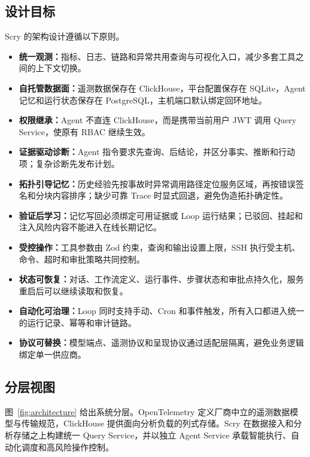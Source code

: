 \documentclass[conference,10pt]{IEEEtran}
\begin{document}
\subsection{设计目标}

Scry 的架构设计遵循以下原则。

\begin{itemize}
  \item \textbf{统一观测：}指标、日志、链路和异常共用查询与可视化入口，减少多套工具之间的上下文切换。
  \item \textbf{自托管数据面：}遥测数据保存在 ClickHouse，平台配置保存在 SQLite，Agent 记忆和运行状态保存在 PostgreSQL，主机端口默认绑定回环地址。
  \item \textbf{权限继承：}Agent 不直连 ClickHouse，而是携带当前用户 JWT 调用 Query Service，使原有 RBAC 继续生效。
  \item \textbf{证据驱动诊断：}Agent 指令要求先查询、后结论，并区分事实、推断和行动项；复杂诊断先发布计划。
  \item \textbf{拓扑引导记忆：}历史经验先按事故时异常调用路径定位服务区域，再按错误签名和分块内容排序；缺少可靠 Trace 时显式回退，避免伪造拓扑确定性。
  \item \textbf{验证后学习：}记忆写回必须绑定可用证据或 Loop 运行结果；已驳回、挂起和注入风险内容不能进入在线长期记忆。
  \item \textbf{受控操作：}工具参数由 Zod 约束，查询和输出设置上限，SSH 执行受主机、命令、超时和审批策略共同控制。
  \item \textbf{状态可恢复：}对话、工作流定义、运行事件、步骤状态和审批点持久化，服务重启后可以继续读取和恢复。
  \item \textbf{自动化可治理：}Loop 同时支持手动、Cron 和事件触发，所有入口都进入统一的运行记录、幂等和审计链路。
  \item \textbf{协议可替换：}模型端点、遥测协议和呈现协议通过适配层隔离，避免业务逻辑绑定单一供应商。
\end{itemize}

\subsection{分层视图}

图~\ref{fig:architecture} 给出系统分层。OpenTelemetry 定义厂商中立的遥测数据模型与传输规范\cite{otel}，ClickHouse 提供面向分析负载的列式存储\cite{clickhouse}。Scry 在数据接入和分析存储之上构建统一 Query Service，并以独立 Agent Service 承载智能执行、自动化调度和高风险操作控制。
\end{document}
